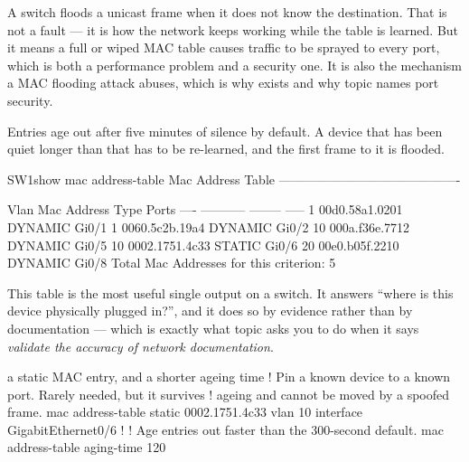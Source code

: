 \begin{alertbox}
A switch floods a unicast frame when it does not know the destination. That is
not a fault --- it is how the network keeps working while the table is learned.
But it means a full or wiped MAC table causes traffic to be sprayed to every
port, which is both a performance problem and a security one. It is also the
mechanism a MAC flooding attack abuses, which is why  exists
and why topic  names port security.
\end{alertbox}

Entries age out after five minutes of silence by default. A device that has been
quiet longer than that has to be re-learned, and the first frame to it is
flooded.

\begin{verify}{SW1}{show mac address-table}
          Mac Address Table
-------------------------------------------

Vlan    Mac Address       Type        Ports
----    -----------       --------    -----
   1    00d0.58a1.0201    DYNAMIC     Gi0/1
   1    0060.5c2b.19a4    DYNAMIC     Gi0/2
  10    000a.f36e.7712    DYNAMIC     Gi0/5
  10    0002.1751.4c33    STATIC      Gi0/6
  20    00e0.b05f.2210    DYNAMIC     Gi0/8
Total Mac Addresses for this criterion: 5
\end{verify}

This table is the most useful single output on a switch. It answers ``where is
this device physically plugged in?'', and it does so by evidence rather than by
documentation --- which is exactly what topic  asks you to do when it
says \emph{validate the accuracy of network documentation}.

\begin{config}{a static MAC entry, and a shorter ageing time}
! Pin a known device to a known port. Rarely needed, but it survives
! ageing and cannot be moved by a spoofed frame.
mac address-table static 0002.1751.4c33 vlan 10 interface GigabitEthernet0/6
!
! Age entries out faster than the 300-second default.
mac address-table aging-time 120
\end{config}

